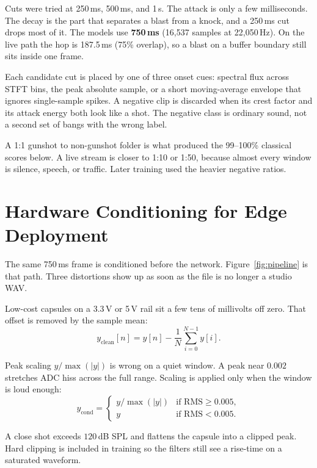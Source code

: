 \documentclass[conference]{IEEEtran}
\begin{document}
Cuts were tried at 250\,ms, 500\,ms, and 1\,s. The attack is only a few milliseconds. The decay is the part that separates a blast from a knock, and a 250\,ms cut drops most of it. The models use \textbf{750\,ms} (16{,}537 samples at 22{,}050\,Hz). On the live path the hop is 187.5\,ms (75\% overlap), so a blast on a buffer boundary still sits inside one frame.

Each candidate cut is placed by one of three onset cues: spectral flux across STFT bins, the peak absolute sample, or a short moving-average envelope that ignores single-sample spikes. A negative clip is discarded when its crest factor and its attack energy both look like a shot. The negative class is ordinary sound, not a second set of bangs with the wrong label.

A 1:1 gunshot to non-gunshot folder is what produced the 99--100\% classical scores below. A live stream is closer to 1:10 or 1:50, because almost every window is silence, speech, or traffic. Later training used the heavier negative ratios.

\section{Hardware Conditioning for Edge Deployment}
\label{sec:conditioning}

The same 750\,ms frame is conditioned before the network. Figure~\ref{fig:pipeline} is that path. Three distortions show up as soon as the file is no longer a studio WAV.

Low-cost capsules on a 3.3\,V or 5\,V rail sit a few tens of millivolts off zero. That offset is removed by the sample mean:
\begin{equation}
    y_{\mathrm{clean}}[n] = y[n] - \frac{1}{N}\sum_{i=0}^{N-1} y[i].
    \label{eq:dc_strip}
\end{equation}

Peak scaling $y/\max(|y|)$ is wrong on a quiet window. A peak near $0.002$ stretches ADC hiss across the full range. Scaling is applied only when the window is loud enough:
\begin{equation}
    y_{\mathrm{cond}} =
    \begin{cases}
        y / \max(|y|) & \text{if RMS} \ge 0.005, \\
        y & \text{if RMS} < 0.005.
    \end{cases}
    \label{eq:energy_gate}
\end{equation}

A close shot exceeds $120$\,dB SPL and flattens the capsule into a clipped peak. Hard clipping is included in training so the filters still see a rise-time on a saturated waveform.
\end{document}
